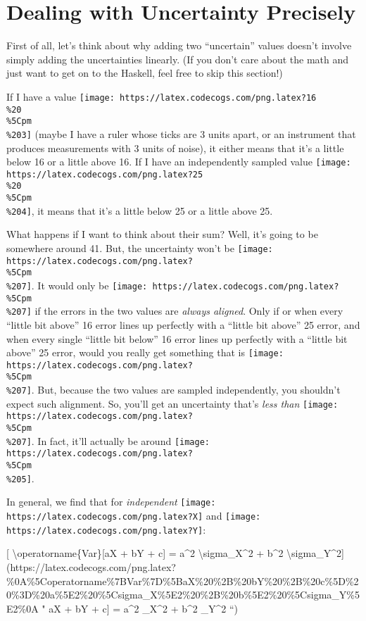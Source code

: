 \documentclass[]{article}
\begin{document}
\section{Dealing with Uncertainty
Precisely}\label{dealing-with-uncertainty-precisely}

First of all, let's think about why adding two ``uncertain'' values doesn't
involve simply adding the uncertainties linearly. (If you don't care about the
math and just want to get on to the Haskell, feel free to skip this section!)

If I have a value
\texttt{[image: https://latex.codecogs.com/png.latex?16\\\%20\\\%5Cpm\\\%203]} (maybe
I have a ruler whose ticks are 3 units apart, or an instrument that produces
measurements with 3 units of noise), it either means that it's a little below 16
or a little above 16. If I have an independently sampled value
\texttt{[image: https://latex.codecogs.com/png.latex?25\\\%20\\\%5Cpm\\\%204]}, it
means that it's a little below 25 or a little above 25.

What happens if I want to think about their sum? Well, it's going to be
somewhere around 41. But, the uncertainty won't be
\texttt{[image: https://latex.codecogs.com/png.latex?\\\%5Cpm\\\%207]}. It would
only be \texttt{[image: https://latex.codecogs.com/png.latex?\\\%5Cpm\\\%207]} if
the errors in the two values are \emph{always aligned}. Only if or when every
``little bit above'' 16 error lines up perfectly with a ``little bit above'' 25
error, and when every single ``little bit below'' 16 error lines up perfectly
with a ``little bit above'' 25 error, would you really get something that is
\texttt{[image: https://latex.codecogs.com/png.latex?\\\%5Cpm\\\%207]}. But, because
the two values are sampled independently, you shouldn't expect such alignment.
So, you'll get an uncertainty that's \emph{less than}
\texttt{[image: https://latex.codecogs.com/png.latex?\\\%5Cpm\\\%207]}. In fact,
it'll actually be around
\texttt{[image: https://latex.codecogs.com/png.latex?\\\%5Cpm\\\%205]}.

In general, we find that for \emph{independent}
\texttt{[image: https://latex.codecogs.com/png.latex?X]} and
\texttt{[image: https://latex.codecogs.com/png.latex?Y]}:

{[} \textbackslash{}operatorname\{Var\}{[}aX + bY + c{]} = a\^{}2
\textbackslash{}sigma\_X\^{}2 + b\^{}2
\textbackslash{}sigma\_Y\^{}2{]}(https://latex.codecogs.com/png.latex?\%0A\%5Coperatorname\%7BVar\%7D\%5BaX\%20\%2B\%20bY\%20\%2B\%20c\%5D\%20\%3D\%20a\%5E2\%20\%5Csigma\_X\%5E2\%20\%2B\%20b\%5E2\%20\%5Csigma\_Y\%5E2\%0A
" \operatorname{Var}{[}aX + bY + c{]} = a\^{}2 \sigma\_X\^{}2 + b\^{}2
\sigma\_Y\^{}2 ``)
\end{document}
